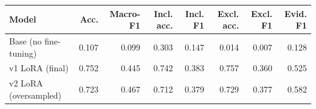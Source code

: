 \begin{tabular}{lrrrrrrr}\toprule
Model & Acc. & Macro-F1 & Incl. acc. & Incl. F1 & Excl. acc. & Excl. F1 & Evid. F1 \\ \midrule
Base (no fine-tuning) & 0.107 & 0.099 & 0.303 & 0.147 & 0.014 & 0.007 & 0.128 \\
v1 LoRA (final) & 0.752 & 0.445 & 0.742 & 0.383 & 0.757 & 0.360 & 0.525 \\
v2 LoRA (oversampled) & 0.723 & 0.467 & 0.712 & 0.379 & 0.729 & 0.377 & 0.582 \\
\bottomrule\end{tabular}